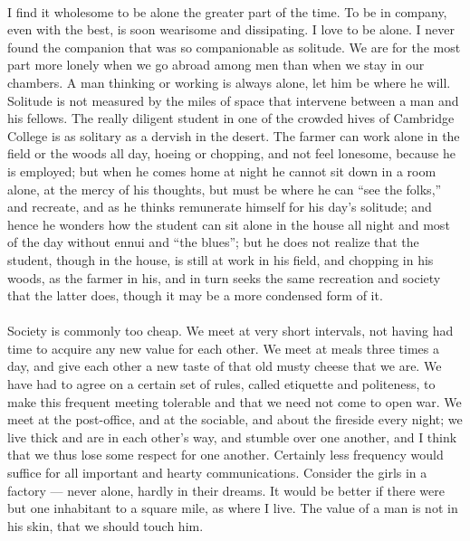 \documentclass[letterpaper,12pt]{article}
\begin{document}
\paragraph{}
I find it wholesome to be alone the greater part of the time. To be in company,
even with the best, is soon wearisome and dissipating. I love to be alone. I
never found the companion that was so companionable as solitude. We are for the
most part more lonely when we go abroad among men than when we stay in our
chambers. A man thinking or working is always alone, let him be where he will.
Solitude is not measured by the miles of space that intervene between a man and
his fellows. The really diligent student in one of the crowded hives of
Cambridge College is as solitary as a dervish in the desert. The farmer can work
alone in the field or the woods all day, hoeing or chopping, and not feel
lonesome, because he is employed; but when he comes home at night he cannot sit
down in a room alone, at the mercy of his thoughts, but must be where he can
\enquote{see the folks,} and recreate, and as he thinks remunerate himself for
his day's solitude; and hence he wonders how the student can sit alone in the
house all night and most of the day without ennui and \enquote{the blues}; but
he does not realize that the student, though in the house, is still at work in
his field, and chopping in his woods, as the farmer in his, and in turn seeks
the same recreation and society that the latter does, though it may be a more
condensed form of it.

\paragraph{}
Society is commonly too cheap. We meet at very short intervals, not having had
time to acquire any new value for each other. We meet at meals three times a
day, and give each other a new taste of that old musty cheese that we are. We
have had to agree on a certain set of rules, called etiquette and politeness, to
make this frequent meeting tolerable and that we need not come to open war. We
meet at the post-office, and at the sociable, and about the fireside every
night; we live thick and are in each other's way, and stumble over one another,
and I think that we thus lose some respect for one another. Certainly less
frequency would suffice for all important and hearty communications. Consider
the girls in a factory --- never alone, hardly in their dreams. It would be
better if there were but one inhabitant to a square mile, as where I live. The
value of a man is not in his skin, that we should touch him.
\end{document}

